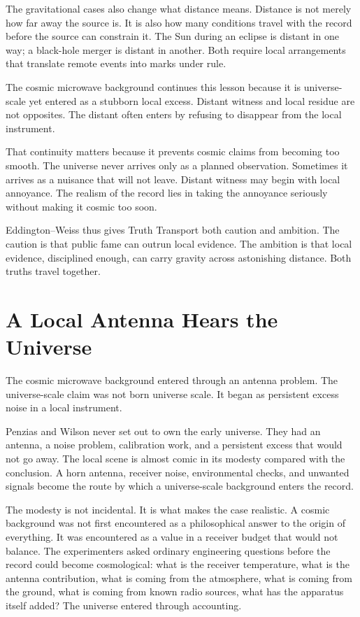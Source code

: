 The gravitational cases also change what distance means. Distance is not
merely how far away the source is. It is also how many conditions travel
with the record before the source can constrain it. The Sun during an
eclipse is distant in one way; a black-hole merger is distant in another.
Both require local arrangements that translate remote events into marks
under rule.

The cosmic microwave background continues this lesson because it is
universe-scale yet entered as a stubborn local excess. Distant witness and
local residue are not opposites. The distant often enters by refusing to
disappear from the local instrument.

That continuity matters because it prevents cosmic claims from becoming
too smooth. The universe never arrives only as a planned observation.
Sometimes it arrives as a nuisance that will not leave. Distant witness
may begin with local annoyance. The realism of the record lies in taking
the annoyance seriously without making it cosmic too soon.

Eddington--Weiss thus gives Truth Transport both caution and ambition.
The caution is that public fame can outrun local evidence. The ambition
is that local evidence, disciplined enough, can carry gravity across
astonishing distance. Both truths travel together.

\section{A Local Antenna Hears the Universe}

The cosmic microwave background entered through an antenna problem. The
universe-scale claim was not born universe scale. It began as persistent
excess noise in a local instrument.

Penzias and Wilson never set out to own the early universe. They had an
antenna, a noise problem, calibration work, and a persistent excess that
would not go away. The local scene is almost comic in its modesty compared
with the conclusion. A horn antenna, receiver noise, environmental checks,
and unwanted signals become the route by which a universe-scale background
enters the record.

The modesty is not incidental. It is what makes the case realistic. A
cosmic background was not first encountered as a philosophical answer to
the origin of everything. It was encountered as a value in a receiver
budget that would not balance. The experimenters asked ordinary engineering
questions before the record could become cosmological: what is the receiver
temperature, what is the antenna contribution, what is coming from the
atmosphere, what is coming from the ground, what is coming from known radio
sources, what has the apparatus itself added? The universe entered through
accounting.

